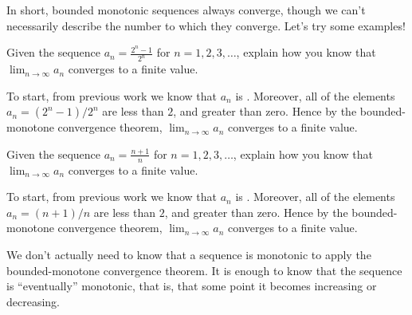 \documentclass{ximera}
\begin{document}
In short, bounded monotonic sequences always converge, though we can't
necessarily describe the number to which they converge.  Let's try
some examples!

\begin{example}
  Given the sequence $a_n=\frac{2^n-1}{2^n}$ for $n=1,2,3,\dots$,
  explain how you know that $\lim_{n\to\infty} a_n$ converges to a
  finite value.
  \begin{explanation}
    To start, from previous work we know that $a_n$ is
    .
    Moreover, all of the elements $a_n = (2^n-1)/2^n$ are less than
    $2$, and greater than zero. Hence by the bounded-monotone
    convergence theorem, $\lim_{n\to\infty} a_n$ converges to a finite
    value.
  \end{explanation}
\end{example}

\begin{example}
  Given the sequence $a_n=\frac{n+1}{n}$ for $n=1,2,3,\dots$,
  explain how you know that $\lim_{n\to\infty} a_n$ converges to a
  finite value.
  \begin{explanation}
    To start, from previous work we know that $a_n$ is
    .
    Moreover, all of the elements $a_n = (n+1)/n$ are less than $2$,
    and greater than zero. Hence by the bounded-monotone convergence
    theorem, $\lim_{n\to\infty} a_n$ converges to a finite value.
  \end{explanation}
\end{example}

We don't actually need to know that a sequence is monotonic to apply
the bounded-monotone convergence theorem. It is enough to know that
the sequence is ``eventually'' monotonic, that is, that some point it
becomes increasing or decreasing.
\end{document}
